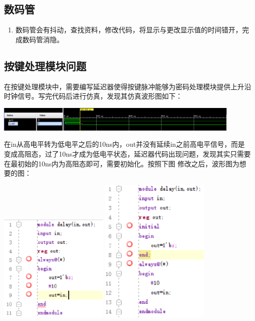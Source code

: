 \documentclass[a4paper,11pt]{ctexart}
\begin{document}
\subsection{数码管}
\begin{enumerate}
  \item 数码管会有抖动，查找资料，修改代码，将显示与更改显示值的时间错开，完成数码管消隐。
\end{enumerate}

\subsection{按键处理模块问题}
在按键处理模块中，需要编写延迟器使得按键脉冲能够为密码处理模块提供上升沿时钟信号。写完代码后进行仿真，发现其仿真波形图如下：

\includegraphics[width=0.9\textwidth]{./images/Lsim1.eps}

在in从高电平转为低电平之后的10ns内，out并没有延续in之前高电平信号，而是变成高阻态，过了10ns才成为低电平状态，延迟器代码出现问题，发现其实只需要在最初始的10ns内为高阻态即可，需要初始化。按照下图
修改之后，波形图为想要的图：

\includegraphics[width=0.4\textwidth]{./images/Lchange1.eps}
\includegraphics[width=0.4\textwidth]{./images/Lchange2.eps}
\end{document}

